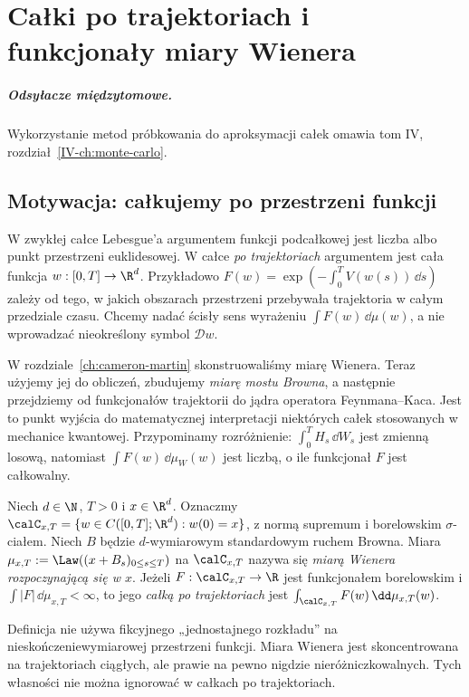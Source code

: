 \chapter{Całki po trajektoriach i funkcjonały miary Wienera}
\label{ch:path-integrals}
\paragraph{Odsyłacze międzytomowe.} Wykorzystanie metod próbkowania do aproksymacji całek omawia tom IV, rozdział~\ref{IV-ch:monte-carlo}.


\section{Motywacja: całkujemy po przestrzeni funkcji}

W zwykłej całce Lebesgue'a argumentem funkcji podcałkowej jest liczba
albo punkt przestrzeni euklidesowej. W całce \emph{po trajektoriach}
argumentem jest cała funkcja $w:[0,T]\to\R^d$. Przykładowo
$F(w)=\exp(-\int_0^T V(w(s))\,\dd s)$ zależy od tego, w jakich
obszarach przestrzeni przebywała trajektoria w całym przedziale czasu.
Chcemy nadać ścisły sens wyrażeniu $\int F(w)\,\dd\mu(w)$, a nie
wprowadzać nieokreślony symbol $\mathcal D w$.

W rozdziale~\ref{ch:cameron-martin} skonstruowaliśmy miarę Wienera.
Teraz użyjemy jej do obliczeń, zbudujemy \emph{miarę mostu Browna},
a następnie przejdziemy od funkcjonałów trajektorii do jądra
operatora Feynmana--Kaca. Jest to punkt wyjścia do matematycznej
interpretacji niektórych całek stosowanych w mechanice kwantowej.
Przypominamy rozróżnienie: $\int_0^T H_s\,\dd W_s$ jest zmienną
losową, natomiast $\int F(w)\,\dd\mu_W(w)$ jest liczbą, o ile
funkcjonał $F$ jest całkowalny.

\begin{definicja}
\label{def:path-wiener}
Niech $d\in\N$, $T>0$ i $x\in\R^d$. Oznaczmy
$\calC_{x,T}=\{w\in C([0,T];\R^d):w(0)=x\}$, z normą
supremum i borelowskim $\sigma$-ciałem. Niech $B$ będzie
$d$-wymiarowym standardowym ruchem Browna. Miara
$\mu_{x,T}:=\Law((x+B_s)_{0\le s\le T})$ na $\calC_{x,T}$
nazywa się \emph{miarą Wienera rozpoczynającą się w $x$}.
Jeżeli $F:\calC_{x,T}\to\R$ jest funkcjonałem borelowskim
i $\int|F|\,\dd\mu_{x,T}<\infty$, to jego \emph{całką
po trajektoriach} jest $\int_{\calC_{x,T}}F(w)\,\dd\mu_{x,T}(w)$.
\end{definicja}

Definicja nie używa fikcyjnego „jednostajnego rozkładu” na
nieskończeniewymiarowej przestrzeni funkcji. Miara Wienera jest
skoncentrowana na trajektoriach ciągłych, ale prawie na pewno
nigdzie nieróżniczkowalnych. Tych własności nie można ignorować
w całkach po trajektoriach.


